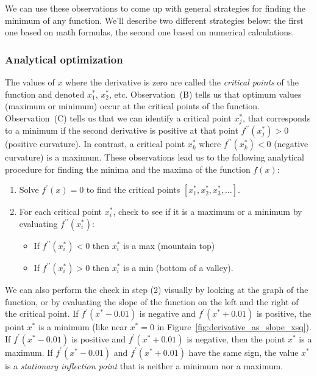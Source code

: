 		\noindent
		We can use these observations to come up
		with general strategies for finding the minimum of any function.
		We'll describe two different strategies below:
		the first one based on math formulas,
		the second one based on numerical calculations.

		\subsubsection{Analytical optimization}

			The values of $x$ where the derivative is zero
			are called the \emph{critical points} of the function and denoted $x_1^*$, $x_2^*$, etc.
			Observation~(B) tells us that optimum values (maximum or minimum)
			occur at the critical points of the function.
			Observation~(C) tells us that we can identify a critical point $x_j^*$,
			that corresponds to a minimum
			if the second derivative is positive at that point $f^{\prime\prime\!}(x_j^*)>0$ (positive curvature).
			In contrast,
			a critical point $x_k^*$ where $f^{\prime\prime\!}(x_k^*)< 0$ (negative curvature) is a maximum.			
			These observations lead us to the following analytical procedure
			for finding the minima and the maxima of the function $f(x)$:

			\begin{enumerate}
				\item[(1)]	Solve $f^{\prime\!}(x)=0$ to find the critical points $[x_1^*, x_2^*, x_3^*, \ldots]$.
				\item[(2)]	For each critical point $x_i^*$,
						check to see if it is a maximum or a minimum
						by evaluating $f^{\prime\prime\!}(x_i^*)$:	%
						\begin{itemize}
							\item	If $f^{\prime\prime}(x_i^*) < 0$ then $x_i^*$ is a max (mountain top) 		%
							\item	If $f^{\prime\prime}(x_i^*) > 0$ then $x_i^*$ is a min (bottom of a valley).	%
						\end{itemize}
			\end{enumerate}

			\noindent
			We can also perform the check in step (2) visually
			by looking at the graph of the function,
			or by evaluating the slope of the function on the left and the right of the critical point.
			If $f^{\prime\!}(x^*-0.01)$ is negative and $f^{\prime\!}(x^*+0.01)$ is positive,
			the point $x^*$ is a minimum (like near $x^*=0$ in Figure~\ref{fig:derivative_as_slope_xsq}).
			If $f^{\prime\!}(x^*-0.01)$ is positive and $f^{\prime\!}(x^*+0.01)$ is negative,
			then the point $x^*$ is a maximum.
			If $f^{\prime\!}(x^*-0.01)$ and $f^{\prime\!}(x^*+0.01)$ have the same sign,
			the value $x^*$ is a \emph{stationary inflection point}
			that is neither a minimum nor a maximum.

